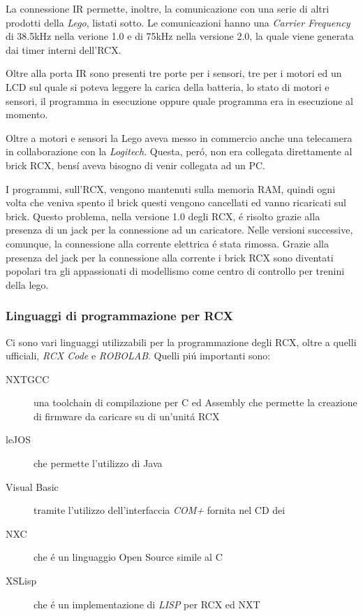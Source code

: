 La connessione IR permette, inoltre, la comunicazione con una serie di
altri prodotti della \emph{Lego}, listati sotto. Le comunicazioni hanno una
\emph{Carrier Frequency} di 38.5kHz nella verione 1.0 e di 75kHz nella
versione 2.0, la quale viene generata dai timer interni dell'RCX.

Oltre alla porta IR sono presenti tre porte per i sensori, tre per i
motori ed un LCD sul quale si poteva leggere la carica della batteria, lo
stato di motori e sensori, il programma in esecuzione oppure quale
programma era in esecuzione al momento.

Oltre a motori e sensori la Lego aveva messo in commercio anche una
telecamera in collaborazione con la \emph{Logitech}. Questa, per\'o, non
era collegata direttamente al brick RCX, bens\'i aveva bisogno di venir
collegata ad un PC.

I programmi, sull'RCX, vengono mantenuti sulla memoria RAM, quindi ogni
volta che veniva spento il brick questi vengono cancellati ed vanno
ricaricati sul brick. Questo problema, nella versione 1.0 degli RCX, \'e
risolto grazie alla presenza di un jack per la connessione ad un
caricatore. Nelle versioni successive, comunque, la connessione alla
corrente elettrica \'e stata rimossa. Grazie alla presenza del jack per la
connessione alla corrente i brick RCX sono diventati popolari tra gli
appassionati di modellismo come centro di controllo per trenini della lego.

\subsubsection{Linguaggi di programmazione per RCX}
Ci sono vari linguaggi utilizzabili per la programmazione degli RCX, oltre
a quelli ufficiali, \emph{RCX Code} e \emph{ROBOLAB}. Quelli pi\'u
importanti sono:
\begin{description}
    \item[NXTGCC]una toolchain di compilazione per C ed Assembly che
        permette la creazione di firmware da caricare su di un'unit\'a RCX
    \item[leJOS]che permette l'utilizzo di Java
    \item[Visual Basic]tramite l'utilizzo dell'interfaccia \emph{COM+}
        fornita nel CD dei \RIS{}
    \item[NXC]che \'e un linguaggio Open Source simile al C
    \item[XSLisp]che \'e un implementazione di \emph{LISP} per RCX ed NXT
\end{description}

